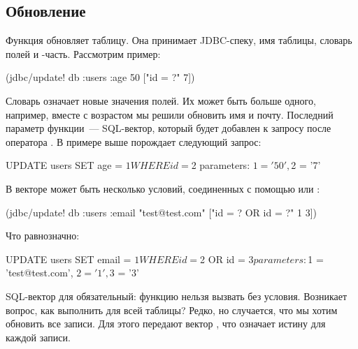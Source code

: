 \subsection{Обновление}

Функция  обновляет таблицу. Она принимает JDBC-спеку, имя таблицы, словарь полей и -часть. Рассмотрим пример:

\begin{english}
  \begin{clojure}
(jdbc/update! db :users {:age 50} ["id = ?" 7])
  \end{clojure}
\end{english}

Словарь  означает новые значения полей. Их может быть больше одного, например, вместе с возрастом мы решили обновить имя и почту. Последний параметр функции~--- SQL-вектор, который будет добавлен к запросу после оператора . В примере выше  порождает следующий запрос:

\begin{english}
  \begin{sql}
UPDATE users SET age = $1 WHERE id = $2
parameters: $1 = '50', $2 = '7'
  \end{sql}
\end{english}

В векторе может быть несколько условий, соединенных с помощью  или :

\begin{english}
  \begin{clojure}
(jdbc/update! db :users
              {:email "test@test.com"}
              ["id = ? OR id = ?" 1 3])
  \end{clojure}
\end{english}

\noindent
Что равнозначно:

\begin{english}
  \begin{sql}
UPDATE users SET email = $1
WHERE id = $2 OR id = $3
parameters:
  $1 = 'test@test.com', $2 = '1', $3 = '3'
  \end{sql}
\end{english}

SQL-вектор для  обязательный: функцию нельзя вызвать без условия. Возникает вопрос, как выполнить  для всей таблицы? Редко, но случается, что мы хотим обновить все записи. Для этого передают вектор \code{["true"]}, что означает истину для каждой записи.

